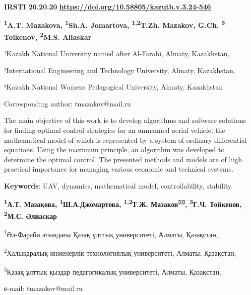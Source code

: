 \newpage
{\bfseries IRSTI 20.20.20}
\hfill {\bfseries \href{https://doi.org/10.58805/kazutb.v.3.24-546}{https://doi.org/10.58805/kazutb.v.3.24-546}}


\begin{center}

{\bfseries \textsuperscript{1}A.T. Mazakova, \textsuperscript{1}Sh.A.
Jomartova, \textsuperscript{1,2}T.Zh. Mazakov\envelope, G.Ch.
\textsuperscript{3} Toikenov, \textsuperscript{2}M.S. Aliaskar}

¹Kazakh National University named after Al-Farabi, Almaty, Kazakhstan,

²International Engineering and Technology University, Almaty,
Kazakhstan,

³Kazakh National Women\textquotesingle s Pedagogical University, Almaty,
Kazakhstan
\end{center}
\envelope Corresponding author: tmazakov@mail.ru \vspace{0.5cm}

The main objective of this work is to develop algorithms and software
solutions for finding optimal control strategies for an unmanned aerial
vehicle, the mathematical model of which is represented by a system of
ordinary differential equations. Using the maximum principle, an
algorithm was developed to determine the optimal control. The presented
methods and models are of high practical importance for managing various
economic and technical systems.

{\bfseries Keywords}: UAV, dynamics, mathematical model, controllability,
stability.


\begin{center}
{\bfseries \textsuperscript{1}А.Т. Мазақова,
\textsuperscript{1}Ш.А.Джомартова, \textsuperscript{1,2}Т.Ж.
Мазаков\textsuperscript{🖂}, \textsuperscript{3}Г.Ч. Тойкенов, \textsuperscript{2}М.С. Әлиаскар}

\textsuperscript{1}Әл-Фараби атындағы Қазақ ұлттық университеті, Алматы,
Қазақстан,

\textsuperscript{2}Халықаралық инженерлік-технологиялық университеті,
Алматы, Қазақстан,

\textsuperscript{3}Қазақ ұлттық қыздар педагогикалық университеті,
Алматы, Қазақстан,

е-mail: tmazakov@mail.ru
\end{center}


